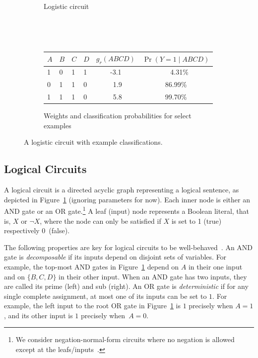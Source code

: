 \documentclass[letterpaper]{article} %
\begin{document}
\begin{figure}[t]
\begin{subfigure}[t]{0.48\textwidth}
{
}
\caption{Logistic circuit\label{fig: logistic circuit}}
\end{subfigure}
\quad~\par~\par
\begin{subfigure}[t]{0.48\textwidth}
\centering
\begin{sc}
{\fontsize{9}{9}\selectfont
\begin{tabular}{ @{} llll c c@{} }
\toprule
$A$ & $B$ & $C$ & $D$  &  $g_r(ABCD) $& $\Pr(Y=1 \mid ABCD)$ \\
\midrule \midrule
1 & 0 & 1 & 1 & -3.1 & ~~4.31\%\\
0 & 1 & 1 & 0 & ~1.9 & 86.99\%\\
1 & 1 & 1 & 0 &~5.8 &99.70\%\\
\bottomrule
\end{tabular}
}
\end{sc}
\caption{Weights and classification probabilities for select examples}\label{fig: posterior distribution}
\end{subfigure}
\caption{A logistic circuit with example classifications.}\label{fig:1}
\end{figure}

\subsection{Logical Circuits}

A logical circuit is a directed acyclic graph  representing a logical sentence, as depicted in Figure~\ref{fig: logistic circuit} (ignoring parameters for now).
Each inner node is either an AND gate or an OR gate.\footnote{We consider negation-normal-form circuits where no negation is allowed except at the leafs/inputs~\cite{darwicheJAIR02}.}
A leaf (input) node represents a Boolean literal, that is, $X$ or $\neg X$, where the node can only be satisfied if $X$ is set to 1 (true) respectively 0~(false).

The following properties are key for logical circuits to be well-behaved~\cite{darwicheJAIR02}.
An AND gate is \emph{decomposable} if its inputs depend on disjoint sets of variables.
For example, the top-most AND gates in Figure~\ref{fig: logistic circuit} depend on $A$ in their one input and on $\{B,C,D\}$ in their other input.
When an AND gate has two inputs, they are called its prime (left) and sub (right).
An OR gate is \emph{deterministic} if for any single complete assignment, at most one of its inputs can be set to $1$. For example, the left input to the root OR gate  in Figure~\ref{fig: logistic circuit} is $1$ precisely when $A=1$, and its other input is $1$ precisely when~$A=0$.
\end{document}
